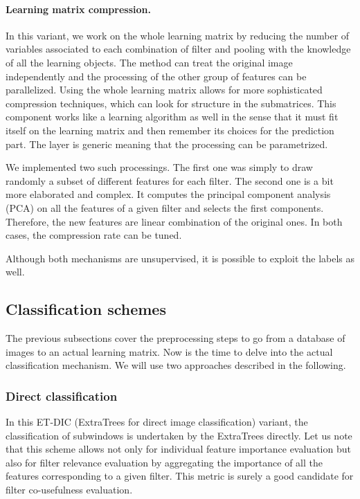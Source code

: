 \documentclass[a4paper]{report}
\begin{document}
		\paragraph{Learning matrix compression.}
		In this variant, we work on the whole learning matrix by reducing the number of variables associated to each combination of filter and pooling with the knowledge of all the learning objects. The method can treat the original image independently and the processing of the other group of features can be parallelized. Using the whole learning matrix allows for more sophisticated compression techniques, which can look for structure in the submatrices. This component works like a learning algorithm as well in the sense that it must fit itself on the learning matrix and then remember its choices for the prediction part.
		The layer is generic meaning that the processing can be parametrized.
		\par
		We implemented two such processings. The first one was simply to draw randomly a subset of different features for each filter. The second one is a bit more elaborated and complex. It computes the principal component analysis (PCA) on all the features of a given filter and selects the first components. Therefore, the new features are linear combination of the original ones. In both cases, the compression rate can be tuned. 
		\par
		Although both mechanisms are unsupervised, it is possible to exploit the labels as well.
		
		\subsection{Classification schemes}
		The previous subsections cover the preprocessing steps to go from a database of images to an actual learning matrix. Now is the time to delve into the actual classification mechanism. We will use two approaches described in the following. 
		
			\subsubsection{Direct classification}
			In this ET-DIC (ExtraTrees for direct image classification) variant, the classification of subwindows is undertaken by the ExtraTrees directly.
			Let us note that this scheme allows not only for individual feature importance evaluation but also for filter relevance evaluation by aggregating the importance of all the features corresponding to a given filter. This metric is surely a good candidate for filter co-usefulness evaluation.
\end{document}
